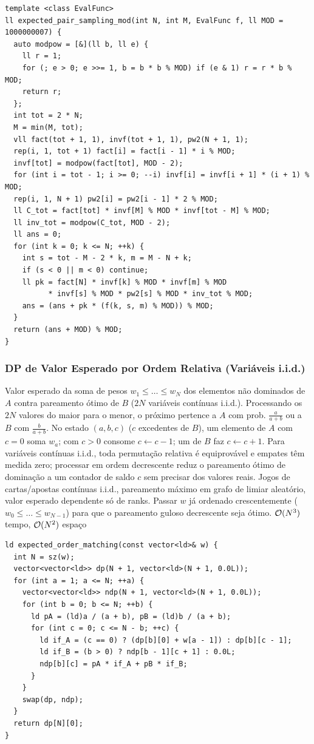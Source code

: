 \begin{lstlisting}
template <class EvalFunc>
ll expected_pair_sampling_mod(int N, int M, EvalFunc f, ll MOD = 1000000007) {
  auto modpow = [&](ll b, ll e) {
    ll r = 1;
    for (; e > 0; e >>= 1, b = b * b % MOD) if (e & 1) r = r * b % MOD;
    return r;
  };
  int tot = 2 * N;
  M = min(M, tot);
  vll fact(tot + 1, 1), invf(tot + 1, 1), pw2(N + 1, 1);
  rep(i, 1, tot + 1) fact[i] = fact[i - 1] * i % MOD;
  invf[tot] = modpow(fact[tot], MOD - 2);
  for (int i = tot - 1; i >= 0; --i) invf[i] = invf[i + 1] * (i + 1) % MOD;
  rep(i, 1, N + 1) pw2[i] = pw2[i - 1] * 2 % MOD;
  ll C_tot = fact[tot] * invf[M] % MOD * invf[tot - M] % MOD;
  ll inv_tot = modpow(C_tot, MOD - 2);
  ll ans = 0;
  for (int k = 0; k <= N; ++k) {
    int s = tot - M - 2 * k, m = M - N + k;
    if (s < 0 || m < 0) continue;
    ll pk = fact[N] * invf[k] % MOD * invf[m] % MOD
          * invf[s] % MOD * pw2[s] % MOD * inv_tot % MOD;
    ans = (ans + pk * (f(k, s, m) % MOD)) % MOD;
  }
  return (ans + MOD) % MOD;
}
\end{lstlisting}

\subsubsection{DP de Valor Esperado por Ordem Relativa (Variáveis i.i.d.)}
\algobox
  {Valor esperado da soma de pesos $w_1 \le \dots \le w_N$ dos elementos não dominados de $A$ contra pareamento ótimo de $B$ ($2N$ variáveis contínuas i.i.d.).}
  {Processando os $2N$ valores do maior para o menor, o próximo pertence a $A$ com prob. $\frac{a}{a+b}$ ou a $B$ com $\frac{b}{a+b}$. No estado $(a, b, c)$ ($c$ excedentes de $B$), um elemento de $A$ com $c = 0$ soma $w_a$; com $c > 0$ consome $c \gets c - 1$; um de $B$ faz $c \gets c + 1$.}
  {Para variáveis contínuas i.i.d., toda permutação relativa é equiprovável e empates têm medida zero; processar em ordem decrescente reduz o pareamento ótimo de dominação a um contador de saldo $c$ sem precisar dos valores reais.}
  {Jogos de cartas/apostas contínuas i.i.d., pareamento máximo em grafo de limiar aleatório, valor esperado dependente só de ranks.}
  {Passar $w$ já ordenado crescentemente ($w_0 \le \dots \le w_{N-1}$) para que o pareamento guloso decrescente seja ótimo.}
  {$\mathcal{O}(N^3)$ tempo, $\mathcal{O}(N^2)$ espaço}

\begin{lstlisting}
ld expected_order_matching(const vector<ld>& w) {
  int N = sz(w);
  vector<vector<ld>> dp(N + 1, vector<ld>(N + 1, 0.0L));
  for (int a = 1; a <= N; ++a) {
    vector<vector<ld>> ndp(N + 1, vector<ld>(N + 1, 0.0L));
    for (int b = 0; b <= N; ++b) {
      ld pA = (ld)a / (a + b), pB = (ld)b / (a + b);
      for (int c = 0; c <= N - b; ++c) {
        ld if_A = (c == 0) ? (dp[b][0] + w[a - 1]) : dp[b][c - 1];
        ld if_B = (b > 0) ? ndp[b - 1][c + 1] : 0.0L;
        ndp[b][c] = pA * if_A + pB * if_B;
      }
    }
    swap(dp, ndp);
  }
  return dp[N][0];
}
\end{lstlisting}

